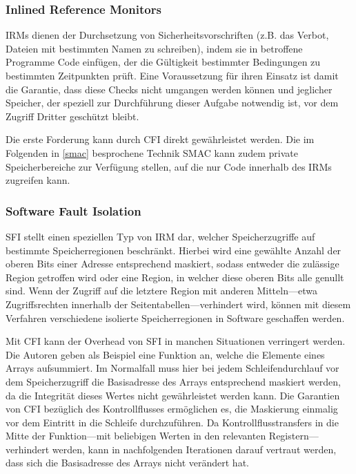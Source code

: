 \documentclass[11pt]{article}
\begin{document}
\subsubsection{Inlined Reference Monitors}

IRMs dienen der Durchsetzung von Sicherheitsvorschriften (z.B. das Verbot,
Dateien mit bestimmten Namen zu schreiben), indem sie in betroffene Programme
Code einfügen, der die Gültigkeit bestimmter Bedingungen zu bestimmten
Zeitpunkten prüft. Eine Voraussetzung für ihren Einsatz ist damit die Garantie,
dass diese Checks nicht umgangen werden können und jeglicher Speicher, der
speziell zur Durchführung dieser Aufgabe notwendig ist, vor dem Zugriff Dritter
geschützt bleibt.

Die erste Forderung kann durch CFI direkt gewährleistet werden. Die im
Folgenden in \ref{smac} besprochene Technik SMAC kann zudem private
Speicherbereiche zur Verfügung stellen, auf die nur Code innerhalb des IRMs
zugreifen kann.

\subsubsection{Software Fault Isolation}

SFI stellt einen speziellen Typ von IRM dar, welcher Speicherzugriffe auf
bestimmte Speicherregionen beschränkt. Hierbei wird eine gewählte Anzahl der
oberen Bits einer Adresse entsprechend maskiert, sodass entweder die zulässige
Region getroffen wird oder eine Region, in welcher diese oberen Bits alle
genullt sind. Wenn der Zugriff auf die letztere Region mit anderen Mitteln—etwa
Zugriffsrechten innerhalb der Seitentabellen—verhindert wird, können mit diesem
Verfahren verschiedene isolierte Speicherregionen in Software geschaffen
werden.

Mit CFI kann der Overhead von SFI in manchen Situationen verringert werden. Die
Autoren geben als Beispiel eine Funktion an, welche die Elemente eines Arrays
aufsummiert. Im Normalfall muss hier bei jedem Schleifendurchlauf vor dem
Speicherzugriff die Basisadresse des Arrays entsprechend maskiert werden, da
die Integrität dieses Wertes nicht gewährleistet werden kann. Die Garantien von
CFI bezüglich des Kontrollflusses ermöglichen es, die Maskierung einmalig vor
dem Eintritt in die Schleife durchzuführen. Da Kontrollflusstransfers in die
Mitte der Funktion—mit beliebigen Werten in den relevanten Registern—verhindert
werden, kann in nachfolgenden Iterationen darauf vertraut werden, dass sich die
Basisadresse des Arrays nicht verändert hat.
\end{document}
